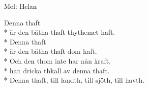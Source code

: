 \begin{SongText}
    \begin{SongInfo}
        Mel: Helan
    \end{SongInfo}
    \begin{SongVerse}
        Denna thaft\\*%
        är den bätha thaft thythemet haft.\\*%
        Denna thaft\\*%
        är den bätha thaft dom haft.\\*%
        Och den thom inte har nån kraft,\\*%
        han dricka thkall av denna thaft.\\*%
        Denna thaft, till landth, till sjöth, till havth.
    \end{SongVerse}
\end{SongText}
